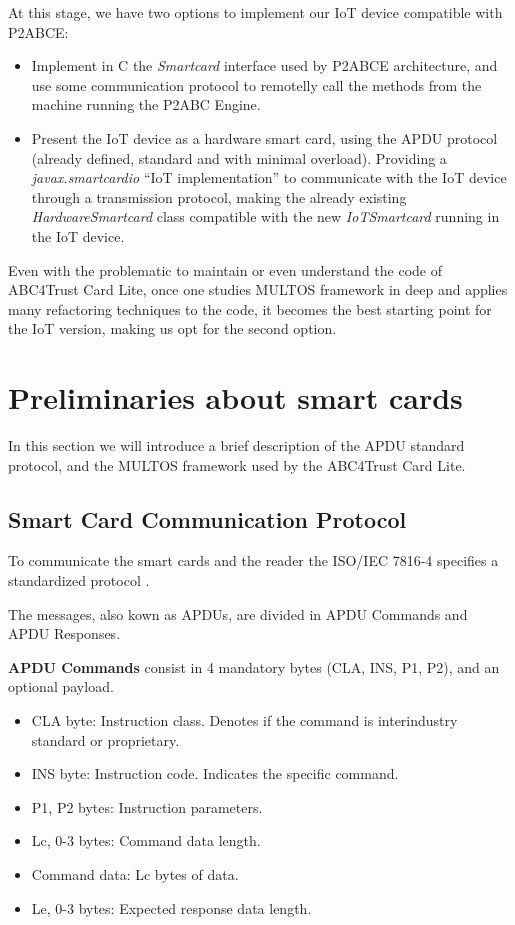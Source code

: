 \hfil

At this stage, we have two options to implement our IoT device compatible with P2ABCE:

\begin{itemize}
	\item Implement in C the \textit{Smartcard} interface used by P2ABCE architecture, and use some communication protocol to remotelly call the methods from the machine running the P2ABC Engine.
	\item Present the IoT device as a hardware smart card, using the APDU protocol (already defined, standard and with minimal overload). Providing a \textit{javax.smartcardio} ``IoT implementation'' to communicate with the IoT device through a transmission protocol, making the already existing \textit{HardwareSmartcard} class compatible with the new \textit{IoTSmartcard} running in the IoT device.
\end{itemize}

Even with the problematic to maintain or even understand the code of ABC4Trust Card Lite, once one studies MULTOS framework in deep and applies many refactoring techniques to the code, it becomes the best starting point for the IoT version, making us opt for the second option.





\section{Preliminaries about smart cards}

In this section we will introduce a brief description of the APDU standard protocol, and the MULTOS framework used by the ABC4Trust Card Lite.


\subsection{Smart Card Communication Protocol}\label{subsec:APDU}

To communicate the smart cards and the reader the ISO/IEC 7816-4 \citep{APDUISO} specifies a standardized protocol .

The messages, also kown as \acp{APDU}, are divided in APDU Commands and APDU Responses.

\textbf{APDU Commands} consist in 4 mandatory bytes (CLA, INS, P1, P2), and an optional payload.

\begin{itemize}
	\item CLA byte: Instruction class. Denotes if the command is interindustry standard or proprietary.
	\item INS byte: Instruction code. Indicates the specific command.
	\item P1, P2 bytes: Instruction parameters.
	\item Lc, 0-3 bytes: Command data length.
	\item Command data: Lc bytes of data.
	\item Le, 0-3 bytes: Expected response data length.
\end{itemize}

